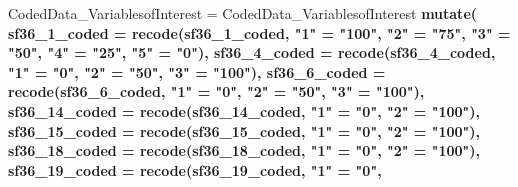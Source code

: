 \documentclass[]{article}
\newenvironment{Shaded}{\begin{snugshade}}{\end{snugshade}}
\newcommand{\DataTypeTok}[1]{\textcolor[rgb]{0.13,0.29,0.53}{#1}}
\newcommand{\DecValTok}[1]{\textcolor[rgb]{0.00,0.00,0.81}{#1}}
\newcommand{\KeywordTok}[1]{\textcolor[rgb]{0.13,0.29,0.53}{\textbf{#1}}}
\newcommand{\NormalTok}[1]{#1}
\newcommand{\OperatorTok}[1]{\textcolor[rgb]{0.81,0.36,0.00}{\textbf{#1}}}
\newcommand{\StringTok}[1]{\textcolor[rgb]{0.31,0.60,0.02}{#1}}
\begin{document}
\begin{Shaded}
\begin{Highlighting}[]
\NormalTok{CodedData_VariablesofInterest =}\StringTok{ }
\StringTok{  }\NormalTok{CodedData_VariablesofInterest }\OperatorTok{%>%}\StringTok{ }
\StringTok{  }\KeywordTok{mutate}\NormalTok{(}
     \DataTypeTok{sf36_1_coded =} \KeywordTok{recode}\NormalTok{(sf36_}\DecValTok{1}\NormalTok{_coded,}
                         \StringTok{"1"}\NormalTok{ =}\StringTok{ "100"}\NormalTok{,}
                         \StringTok{"2"}\NormalTok{ =}\StringTok{ "75"}\NormalTok{,}
                         \StringTok{"3"}\NormalTok{ =}\StringTok{ "50"}\NormalTok{,}
                         \StringTok{"4"}\NormalTok{ =}\StringTok{ "25"}\NormalTok{,}
                         \StringTok{"5"}\NormalTok{ =}\StringTok{ "0"}\NormalTok{),}
        \DataTypeTok{sf36_4_coded =} \KeywordTok{recode}\NormalTok{(sf36_}\DecValTok{4}\NormalTok{_coded, }
                          \StringTok{"1"}\NormalTok{ =}\StringTok{ "0"}\NormalTok{,}
                          \StringTok{"2"}\NormalTok{ =}\StringTok{ "50"}\NormalTok{,}
                          \StringTok{"3"}\NormalTok{ =}\StringTok{ "100"}\NormalTok{),}
        \DataTypeTok{sf36_6_coded =} \KeywordTok{recode}\NormalTok{(sf36_}\DecValTok{6}\NormalTok{_coded, }
                          \StringTok{"1"}\NormalTok{ =}\StringTok{ "0"}\NormalTok{,}
                          \StringTok{"2"}\NormalTok{ =}\StringTok{ "50"}\NormalTok{,}
                          \StringTok{"3"}\NormalTok{ =}\StringTok{ "100"}\NormalTok{),}
         \DataTypeTok{sf36_14_coded =} \KeywordTok{recode}\NormalTok{(sf36_}\DecValTok{14}\NormalTok{_coded, }
                         \StringTok{"1"}\NormalTok{ =}\StringTok{ "0"}\NormalTok{,}
                         \StringTok{"2"}\NormalTok{ =}\StringTok{ "100"}\NormalTok{),}
         \DataTypeTok{sf36_15_coded =} \KeywordTok{recode}\NormalTok{(sf36_}\DecValTok{15}\NormalTok{_coded, }
                         \StringTok{"1"}\NormalTok{ =}\StringTok{ "0"}\NormalTok{,}
                         \StringTok{"2"}\NormalTok{ =}\StringTok{ "100"}\NormalTok{),}
         \DataTypeTok{sf36_18_coded =} \KeywordTok{recode}\NormalTok{(sf36_}\DecValTok{18}\NormalTok{_coded, }
                         \StringTok{"1"}\NormalTok{ =}\StringTok{ "0"}\NormalTok{,}
                         \StringTok{"2"}\NormalTok{ =}\StringTok{ "100"}\NormalTok{), }
         \DataTypeTok{sf36_19_coded =} \KeywordTok{recode}\NormalTok{(sf36_}\DecValTok{19}\NormalTok{_coded, }
                         \StringTok{"1"}\NormalTok{ =}\StringTok{ "0"}\NormalTok{,}
}
\end{Highlighting}
\end{Shaded}
\end{document}
